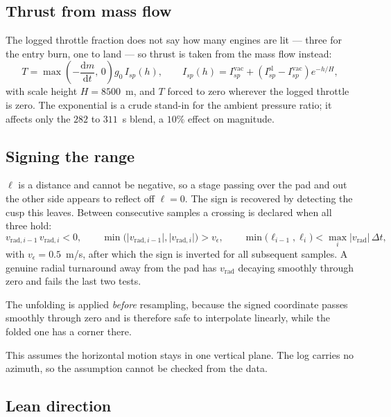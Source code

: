 \documentclass[11pt,a4paper]{article}
\newcommand{\dd}{\mathrm{d}}
\begin{document}
\subsection{Thrust from mass flow}

The logged throttle fraction does not say how many engines are lit --- three for
the entry burn, one to land --- so thrust is taken from the mass flow instead:
\begin{equation}
T = \max\!\left(-\frac{\dd m}{\dd t},\,0\right) g_0\, I_{sp}(h),
\qquad
I_{sp}(h) = I_{sp}^{\mathrm{vac}}
 + \left(I_{sp}^{\mathrm{sl}}-I_{sp}^{\mathrm{vac}}\right) e^{-h/H},
\end{equation}
with scale height $H=8500$~m, and $T$ forced to zero wherever the logged
throttle is zero. The exponential is a crude stand-in for the ambient pressure
ratio; it affects only the $282$ to $311$~s blend, a $10\%$ effect on magnitude.

\subsection{Signing the range}

$\ell$ is a distance and cannot be negative, so a stage passing over the pad and
out the other side appears to reflect off $\ell=0$. The sign is recovered by
detecting the cusp this leaves. Between consecutive samples a crossing is
declared when all three hold:
\begin{equation}
v_{\mathrm{rad},i-1}\,v_{\mathrm{rad},i} < 0,
\qquad
\min\bigl(\lvert v_{\mathrm{rad},i-1}\rvert,\lvert v_{\mathrm{rad},i}\rvert\bigr) > v_\epsilon,
\qquad
\min\bigl(\ell_{i-1},\ell_i\bigr) < \max_i\lvert v_{\mathrm{rad}}\rvert\,\Delta t ,
\end{equation}
with $v_\epsilon=0.5$~m/s, after which the sign is inverted for all subsequent
samples. A genuine radial turnaround away from the pad has $v_{\mathrm{rad}}$
decaying smoothly through zero and fails the last two tests.

The unfolding is applied \emph{before} resampling, because the signed coordinate
passes smoothly through zero and is therefore safe to interpolate linearly,
while the folded one has a corner there.

This assumes the horizontal motion stays in one vertical plane. The log carries
no azimuth, so the assumption cannot be checked from the data.

\subsection{Lean direction}
\end{document}

